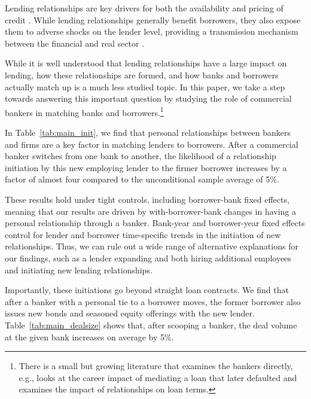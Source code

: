 \documentclass[12pt]{article}
\begin{document}
\begin{abstract}
  \iflongabs{\abslong}{\abs}
\end{abstract}
\cleardoublepage

\doublespacing
\setcounter{page}{1}


Lending relationships are key drivers for both the availability and pricing of credit \citep{Bharath2007, Ioannidou2010}. While lending relationships generally benefit borrowers, they also expose them to adverse shocks on the lender level, providing a transmission mechanism between the financial and real sector \citep{Ivashina2010, chodorow2014}. 

While it is well understood that lending relationships have a large impact on lending, how these relationships are formed, and how banks and borrowers actually match up is a much less studied topic. In this paper, we take a step towards answering this important question by studying the role of commercial bankers in matching banks and borrowers.\footnote{There is a small but growing literature that examines  the bankers directly, e.g., \cite{Gao2018} looks at the career impact of mediating a loan that later defaulted and \cite{Herpfer2017a} examines the impact of relationships on loan terms.}

In Table~\ref{tab:main_init}, we find that personal relationships between bankers and firms are a key factor in matching lenders to borrowers. After a commercial banker switches from one bank to another, the likelihood of a relationship initiation by this new employing lender to the firmer borrower increases by a factor of almost four compared to the unconditional sample average of 5\%. 

These results hold under tight controls, including borrower-bank fixed effects, meaning that our results are driven by with-borrower-bank changes in having a personal relationship through a banker. Bank-year and borrower-year fixed effects control for lender and borrower time-specific trends in the initiation of new relationships. Thus, we can rule out a wide range of alternative explanations for our findings, such as a lender expanding and both hiring additional employees and initiating new lending relationships. 

Importantly, these initiations go beyond straight loan contracts. We find that after a banker with a personal tie to a borrower moves, the former borrower also issues new bonds and seasoned equity offerings with the new lender. Table~\ref{tab:main_dealsize} shows that, after scooping a banker, the deal volume at the given bank increases on average by 5\%.
\end{document}
